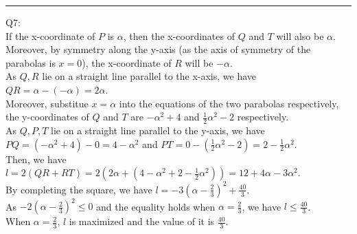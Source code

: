 \documentclass{article}
\begin{document}
\vspace{1cm}
\hrule
\vspace{1cm}

\noindent Q7:\\
If the x-coordinate of $P$ is $\alpha$, then the x-coordinates of $Q$ and $T$ will also be $\alpha$. Moreover, by symmetry along the y-axis (as the axis of symmetry of the parabolas is $x=0$), the x-coordinate of $R$ will be $-\alpha$.\\
As $Q,R$ lie on a straight line parallel to the x-axis, we have \\
$QR=\alpha-(-\alpha)=\boxed2\alpha$.\\
Moreover, substitue $x=\alpha$ into the equations of the two parabolas respectively, the y-coordinates of $Q$ and $T$ are $-\alpha^2+4$ and $\frac{1}{2}\alpha^2-2$ respectively.\\
As $Q,P,T$ lie on a straight line parallel to the y-axis, we have\\
$PQ=(-\alpha^2+4)-0=\boxed4-\alpha^2$ and $PT=0-(\frac{1}{2}\alpha^2-2)=\boxed2-\frac{1}{\boxed2}\alpha^2$.\\
Then, we have $l=2(QR+RT)=2(2\alpha+(4-\alpha^2+2-\frac{1}{2}\alpha^2))=\boxed{12}+\boxed4\alpha-\boxed3\alpha^2$.\\
By completing the square, we have $l=-3(\alpha-\frac{2}{3})^2+\frac{40}{3}$.\\
As $-2(\alpha-\frac{2}{3})^2\leq0$ and the equality holds when $\alpha=\frac{2}{3}$, we have $l\leq \frac{40}{3}$.\\
When $\alpha=\boxed{\frac{2}{3}}$, $l$ is maximized and the value of it is $\boxed{\frac{40}{3}}$.
\end{document}
